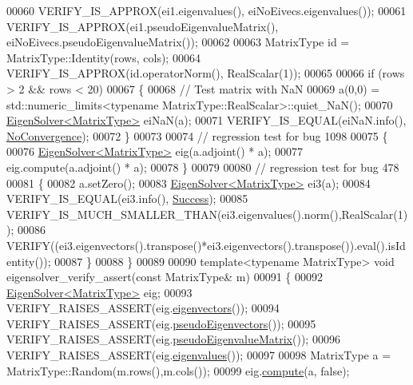 \begin{DoxyCode}
00060   VERIFY\_IS\_APPROX(ei1.eigenvalues(), eiNoEivecs.eigenvalues());
00061   VERIFY\_IS\_APPROX(ei1.pseudoEigenvalueMatrix(), eiNoEivecs.pseudoEigenvalueMatrix());
00062 
00063   MatrixType \textcolor{keywordtype}{id} = MatrixType::Identity(rows, cols);
00064   VERIFY\_IS\_APPROX(\textcolor{keywordtype}{id}.operatorNorm(), RealScalar(1));
00065 
00066   \textcolor{keywordflow}{if} (rows > 2 && rows < 20)
00067   \{
00068     \textcolor{comment}{// Test matrix with NaN}
00069     a(0,0) = std::numeric\_limits<typename MatrixType::RealScalar>::quiet\_NaN();
00070     \hyperlink{group___eigenvalues___module_class_eigen_1_1_eigen_solver}{EigenSolver<MatrixType>} eiNaN(a);
00071     VERIFY\_IS\_EQUAL(eiNaN.info(), \hyperlink{group__enums_gga85fad7b87587764e5cf6b513a9e0ee5eaba1c8763d1179778070f365ecc4157a8}{NoConvergence});
00072   \}
00073 
00074   \textcolor{comment}{// regression test for bug 1098}
00075   \{
00076     \hyperlink{group___eigenvalues___module_class_eigen_1_1_eigen_solver}{EigenSolver<MatrixType>} eig(a.adjoint() * a);
00077     eig.compute(a.adjoint() * a);
00078   \}
00079 
00080   \textcolor{comment}{// regression test for bug 478}
00081   \{
00082     a.setZero();
00083     \hyperlink{group___eigenvalues___module_class_eigen_1_1_eigen_solver}{EigenSolver<MatrixType>} ei3(a);
00084     VERIFY\_IS\_EQUAL(ei3.info(), \hyperlink{group__enums_gga85fad7b87587764e5cf6b513a9e0ee5ea52581b035f4b59c203b8ff999ef5fcea}{Success});
00085     VERIFY\_IS\_MUCH\_SMALLER\_THAN(ei3.eigenvalues().norm(),RealScalar(1));
00086     VERIFY((ei3.eigenvectors().transpose()*ei3.eigenvectors().transpose()).eval().isIdentity());
00087   \}
00088 \}
00089 
00090 \textcolor{keyword}{template}<\textcolor{keyword}{typename} MatrixType> \textcolor{keywordtype}{void} eigensolver\_verify\_assert(\textcolor{keyword}{const} MatrixType& m)
00091 \{
00092   \hyperlink{group___eigenvalues___module_class_eigen_1_1_eigen_solver}{EigenSolver<MatrixType>} eig;
00093   VERIFY\_RAISES\_ASSERT(eig.\hyperlink{group___eigenvalues___module_a66288022802172e3ee059283b26201d7}{eigenvectors}());
00094   VERIFY\_RAISES\_ASSERT(eig.\hyperlink{group___eigenvalues___module_a4e796226f06e1f7347cf03a38755a155}{pseudoEigenvectors}());
00095   VERIFY\_RAISES\_ASSERT(eig.\hyperlink{group___eigenvalues___module_a4979eafe0aeef06b19ada7fa5e19db17}{pseudoEigenvalueMatrix}());
00096   VERIFY\_RAISES\_ASSERT(eig.\hyperlink{group___eigenvalues___module_a114189009e42f5e03372a7a3dfa33b97}{eigenvalues}());
00097 
00098   MatrixType a = MatrixType::Random(m.rows(),m.cols());
00099   eig.\hyperlink{group___eigenvalues___module_a38d032b75b3e75640e3db42e7ab20c24}{compute}(a, \textcolor{keyword}{false});

\end{DoxyCode}
